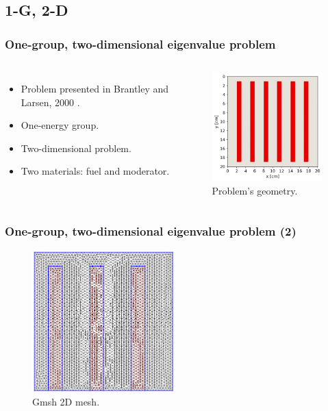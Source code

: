 \subsection{1-G, 2-D}

\begin{frame}
\frametitle{One-group, two-dimensional eigenvalue problem}

\begin{columns}
    \column[t]{4cm}
    \begin{itemize}
        \item Problem presented in Brantley and Larsen, 2000 \cite{brantley_simplifiedP3_2000}.
        \item One-energy group.
        \item Two-dimensional problem.
        \item Two materials: fuel and moderator.
    \end{itemize}

    \column[t]{6cm}
    \begin{figure}[htbp!]
        \begin{center}
            \includegraphics[width=6cm]{figures/mesh2}
        \end{center}
        \caption{Problem's geometry.}
    \end{figure}
\end{columns}
\end{frame}


\begin{frame}
\frametitle{One-group, two-dimensional eigenvalue problem (2)}

    \begin{figure}[htbp!]
        \begin{center}
            \includegraphics[width=5.5cm]{figures/mesh2b}
        \end{center}
        \caption{Gmsh 2D mesh.}
    \end{figure}
\end{frame}


